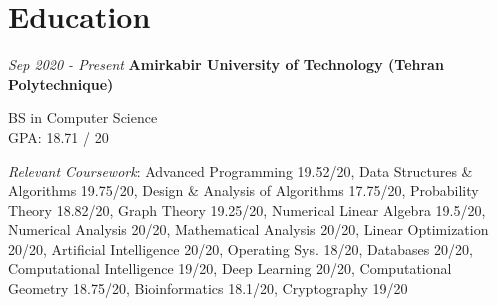 
\section{Education}




\begin{twocolentry}{\textit{Sep 2020 - Present}}
	\textbf{Amirkabir University of Technology (Tehran Polytechnique)}
	
	BS in Computer Science
	\\
	GPA: 18.71 / 20
\end{twocolentry}
	\hspace{0.1cm}
	{\footnotesize
	\textit{Relevant Coursework}: 	Advanced Programming 19.52/20, 
	Data Structures \& Algorithms 19.75/20, 
	Design \& Analysis of Algorithms 17.75/20, 
	Probability Theory 18.82/20, 
	Graph Theory 19.25/20, 
	Numerical Linear Algebra 19.5/20, 
	Numerical Analysis 20/20, 
	Mathematical Analysis 20/20, 
	Linear Optimization 20/20, 
	Artificial Intelligence 20/20, 
	Operating Sys. 18/20, Databases 20/20, 
	Computational Intelligence 19/20, 
	Deep Learning 20/20, 
	Computational Geometry 18.75/20, 
	Bioinformatics 18.1/20, 
	Cryptography 19/20}
	

